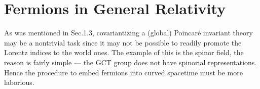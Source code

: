 \documentclass[11pt,a4paper]{article}
\begin{document}
\section{Fermions in General Relativity}

As was mentioned in Sec.1.3, covariantizing a (global) Poincar\'e invariant theory may be a nontrivial task since it
may not be possible to readily promote the Lorentz indices to the world ones. The example of this is the spinor field, the reason is fairly simple --- the GCT group does not have spinorial representations. Hence the procedure to embed fermions into curved spacetime must be more laborious.

\end{document}
